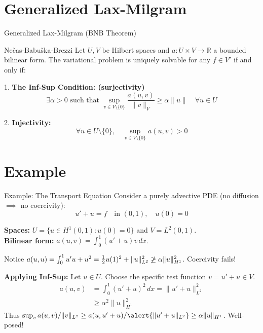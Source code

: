\documentclass[aspectratio=169]{beamer}
\begin{document}
\section{Generalized Lax-Milgram}

\begin{frame}{Generalized Lax-Milgram (BNB Theorem)}
    
    \begin{block}{Ne\v{c}as-Babu\v{s}ka-Brezzi}
        Let $U, V$ be Hilbert spaces and $a: U \times V \to \mathbb{R}$ a bounded bilinear form. The variational problem is uniquely solvable for any $f \in V'$ if and only if:
    
        \vspace{0.2cm}
        1. \textbf{The Inf-Sup Condition: (surjectivity)}
        $$ \exists \alpha > 0 \text{ such that } \sup_{v \in V \setminus \{0\}} \frac{a(u,v)}{\|v\|_V} \ge \alpha \|u \| \quad \forall u \in U $$
    
        2. \textbf{Injectivity:}
        $$ \forall u \in U \setminus \{0\}, \quad \sup_{v \in V \setminus \{0\}} a(u,v) > 0 $$
    \end{block}
\end{frame}

\section{Example}

\begin{frame}{Example: The Transport Equation}
    Consider a purely advective PDE (no diffusion $\implies$ no coercivity):
    $$ u' + u = f \quad \text{in } (0,1), \quad u(0) = 0 $$
    
    \textbf{Spaces:} $U = \{u \in H^1(0,1) : u(0)=0\}$ and $V = L^2(0,1)$. \\
    \textbf{Bilinear form:} $a(u,v) = \int_0^1 (u' + u)v \, dx$.
    
    Notice $a(u,u) = \int_0^1 u'u + u^2 = \frac{1}{2}u(1)^2 + \|u\|^2_{L^2} \centernot\ge \alpha \|u\|^2_{H^1}$. Coercivity fails!
    
    \textbf{Applying Inf-Sup:} Let $u \in U$. Choose the specific test function $v = u' + u \in V$.
    \begin{align*}
        a(u,v) &= \int_0^1 (u'+u)^2 \, dx = \|u'+u\|_{L^2}^2 \\
        &\ge \alpha^2 \|u\|_{H^1}^2 \tag{ODE Stability / Poincare-type bound}
    \end{align*}
    Thus $\sup_{v} a(u,v)/\|v\|_{L^2} \ge a(u, u'+u)/\alert{\|u'+u\|_{L^2}} \ge \alpha \|u\|_{H^1}$. Well-posed!
\end{frame}
\end{document}

